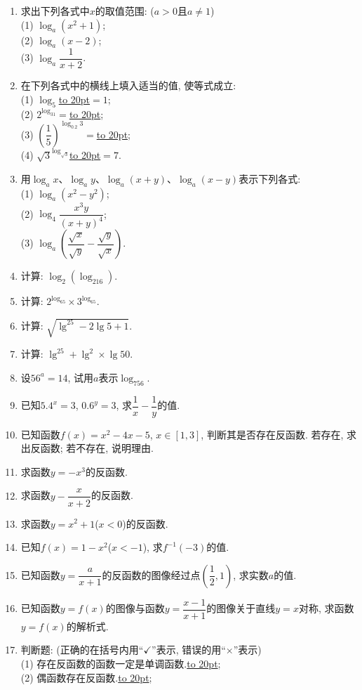 \documentclass[10pt,a4paper]{article}
\newcommand{\blank}[1]{\underline{\hbox to #1pt{}}}
\begin{document}
\begin{enumerate}[1.]
\item 求出下列各式中$x$的取值范围: ($a>0$且$a\ne 1$)\\
(1) $\log _a(x^2+1)$;\\
(2) $\log _a(x-2)$;\\
(3) $\log _a\dfrac 1{x+2}$.
\item 在下列各式中的横线上填入适当的值, 使等式成立:\\
(1) $\log _5$\blank{20}$=1$;\\
(2) $2^{\log _31}=$\blank{20};\\
(3) $(\dfrac 15)^{\log _{0.2}3}=$\blank{20};\\
(4) $\sqrt 3^{\log _{\sqrt 3}}$\blank{20}$=7$.
\item 用$\log _ax$、$\log _ay$、$\log _a(x+y)$、$\log _a(x-y)$表示下列各式:\\
(1) $\log _a(x^2-y^2)$;\\
(2) $\log _4\dfrac{x^3y}{(x+y)^4}$;\\
(3) $\log _a(\dfrac{\sqrt x}{\sqrt y}-\dfrac{\sqrt y}{\sqrt x})$.
\item 计算: $\log _2(\log _216)$.
\item 计算: $2^{\log _65}\times 3^{\log _65}$.
\item 计算: $\sqrt {\lg^25-2\lg 5+1}$.
\item 计算: $\lg ^25+\lg ^2\times \lg 50$.
\item 设$56^a=14$, 试用$a$表示$\log _756$.
\item 已知$5.4^x=3$, $0.6^y=3$, 求$\dfrac 1x-\dfrac 1y$的值.
\item 已知函数$f(x)=x^2-4x-5$, $x\in [1,3]$, 判断其是否存在反函数. 若存在, 求出反函数; 若不存在, 说明理由.
\item 求函数$y=-x^3$的反函数.
\item 求函数$y-\dfrac x{x+2}$的反函数.
\item 求函数$y=x^2+1$($x<0$)的反函数.
\item 已知$f(x)=1-x^2$($x<-1$), 求$f^{-1}(-3)$的值.
\item 已知函数$y=\dfrac a{x+1}$的反函数的图像经过点$(\dfrac 12,1)$, 求实数$a$的值.
\item 已知函数$y=f(x)$的图像与函数$y=\dfrac{x-1}{x+1}$的图像关于直线$y=x$对称, 求函数$y=f(x)$的解析式.
\item 判断题: (正确的在括号内用``$\checkmark$''表示, 错误的用``$\times$''表示)\\
(1) 存在反函数的函数一定是单调函数.\blank{20};\\
(2) 偶函数存在反函数.\blank{20};\\

\end{enumerate}
\end{document}
